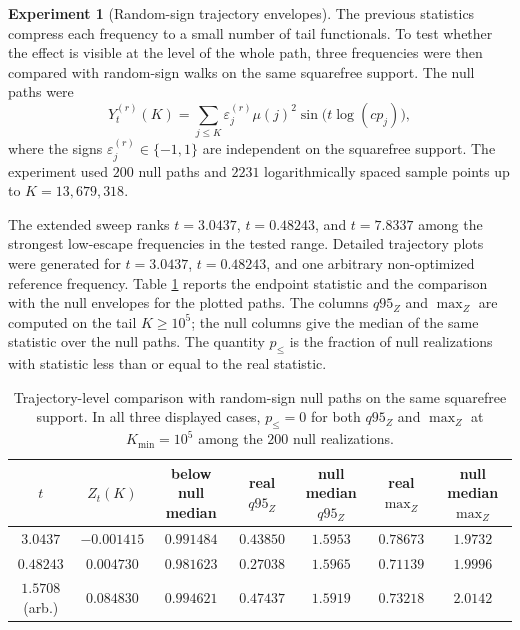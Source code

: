 \documentclass[11pt]{amsart}
\numberwithin{equation}{section}
\theoremstyle{plain}
\theoremstyle{definition}
\newtheorem{experiment}[theorem]{Experiment}
\theoremstyle{remark}
\begin{document}
\begin{experiment}[Random-sign trajectory envelopes]
\label{exp:random_sign_trajectory_envelopes}
The previous statistics compress each frequency to a small number of tail
functionals.  To test whether the effect is visible at the level of the
whole path, three frequencies were then compared with random-sign walks on
the same squarefree support.  The null paths were
\begin{equation}
Y^{(r)}_t(K)=\sum_{j\le K}\varepsilon^{(r)}_j\mu(j)^2
\sin\bigl(t\log(c p_j)\bigr),
\label{eq:random_sign_null_paths}
\end{equation}
where the signs $\varepsilon^{(r)}_j\in\{-1,1\}$ are independent on the
squarefree support.  The experiment used $200$ null paths and $2231$
logarithmically spaced sample points up to $K=13,679,318$.

The extended sweep ranks $t=3.0437$, $t=0.48243$, and $t=7.8337$ among
the strongest low-escape frequencies in the tested range.  Detailed
trajectory plots were generated for $t=3.0437$, $t=0.48243$, and one
arbitrary non-optimized reference frequency.  Table
\ref{tab:trajectory_null_summary} reports the endpoint statistic and the
comparison with the null envelopes for the plotted paths.  The
columns $q95_Z$ and $\max_Z$ are computed on the tail $K\ge 10^5$; the
null columns give the median of the same statistic over the null paths.
The quantity $p_{\le}$ is the fraction of null realizations with statistic
less than or equal to the real statistic.

\begin{table}[htbp]
\centering
\small
\begin{tabular}{ccccccc}
\hline
$t$ & $Z_t(K)$ & below null median & real $q95_Z$ & null median $q95_Z$ & real $\max_Z$ & null median $\max_Z$ \\
\hline
$3.0437$ & $-0.001415$ & $0.991484$ & $0.43850$ & $1.5953$ & $0.78673$ & $1.9732$ \\
$0.48243$ & $0.004730$ & $0.981623$ & $0.27038$ & $1.5965$ & $0.71139$ & $1.9996$ \\
$1.5708$ (arb.) & $0.084830$ & $0.994621$ & $0.47437$ & $1.5919$ & $0.73218$ & $2.0142$ \\
\hline
\end{tabular}
\caption{Trajectory-level comparison with random-sign null paths on the same squarefree support.  In all three displayed cases, $p_{\le}=0$ for both $q95_Z$ and $\max_Z$ at $K_{\min}=10^5$ among the $200$ null realizations.}
\label{tab:trajectory_null_summary}
\end{table}
\end{experiment}
\end{document}
